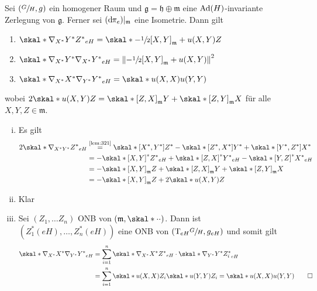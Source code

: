 \begin{korollar}
	Sei $\enbrace*{\sfrac{G}{H},g}$ ein homogener Raum und $\mathfrak{g} = \mathfrak{h} \oplus \mathfrak{m}$ eine $\Ad(H)$-invariante Zerlegung von $\mathfrak{g}$.
	Ferner sei $(\mathd \pi_e)|_{\mathfrak{m}}$ eine Isometrie.
	Dann gilt
	\begin{enumerate}[1)]
		\item $\skal*{\nabla_{X^*} Y^*}{Z^*}_{eH} = \skal*{- \sfrac{1}{2} \benbrace*{X,Y}_{\mathfrak{m}} + u(X,Y)}{Z}$
		\item $\skal*{\nabla_{X^*} Y^*}{\nabla_{X^*} Y^*}_{eH} = \norm*{- \sfrac{1}{2} \benbrace*{X,Y}_\mathfrak{m} + u(X,Y)}^2$
		\item $\skal*{\nabla_{X^*} X^*}{\nabla_{Y^*} Y^*}_{eH} = \skal*{u(X,X)}{u(Y,Y)} $
	\end{enumerate}
	wobei $2\skal*{u(X,Y)}{Z} = \skal*{\benbrace*{Z,X}_\mathfrak{m}}{Y} + \skal*{\benbrace*{Z,Y}_\mathfrak{m}}{X}$ für alle $X,Y,Z \in \mathfrak{m}$.
\end{korollar}
\begin{beweis}
	\begin{enumerate}[(i)]
		\item Es gilt
		\begin{align}
			2 \skal*{\nabla_{X^* Y^*}}{Z^*}_{eH} &\StackText{\ref{lem:321}}{=} \skal*{\benbrace*{X^*,Y^*}}{Z^*} - \skal*{\benbrace*{Z^*,X^*}}{Y^*} + \skal*{\benbrace*{Y^*,Z^*}}{X^*} \\
			&= - \skal*{\benbrace*{X,Y}^* }{Z^*}_{eH} + \skal*{\benbrace*{Z,X}^*}{Y^*}_{eH} - \skal*{\benbrace*{Y,Z}^*}{X^*}_{eH} \\
			&= - \skal*{\benbrace*{X,Y}_\mathfrak{m}}{Z} + \skal*{\benbrace*{Z,X}_\mathfrak{m}}{Y} + \skal*{\benbrace*{Z,Y}_\mathfrak{m}}{X} \\
			&= - \skal*{\benbrace*{X,Y}_\mathfrak{m}}{Z} + 2 \skal*{u(X,Y)}{Z}
		\end{align}
		\item Klar
		\item Sei $(Z_1,\ldots Z_n)$ ONB von $(\mathfrak{m},\skal*{\cdot }{\cdot })$.
		Dann ist $(Z_1^*(eH), \ldots , Z_n^*(eH))$ eine ONB von $\enbrace*{\Tmap_{eH}\sfrac{G}{H},g_{eH}}$ und somit gilt
		\begin{align}
			\skal*{\nabla_{X^*}X^*}{\nabla_{Y^*} Y^*}_{eH} &= \sum_{i=1}^{n} \skal*{\nabla_{X^*} X^*}{Z^*}_{eH} \cdot \skal*{\nabla_{Y^*} Y^*}{Z_i^*}_{eH} \\
			&= \sum_{i=1}^{n} \skal*{u(X,X)}{Z_i} \skal*{u(Y,Y)}{Z_i} = \skal*{u(X,X)}{u(Y,Y)} \qedhere
		\end{align}
	\end{enumerate}
\end{beweis}

